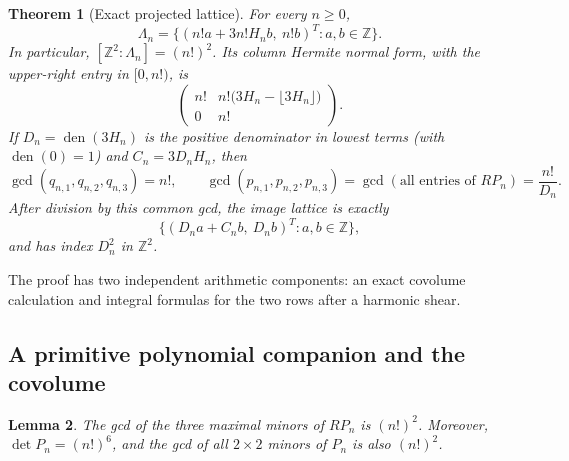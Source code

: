 \documentclass[11pt,a4paper]{article}
\newtheorem{theorem}{Theorem}[section]
\newtheorem{lemma}[theorem]{Lemma}
\theoremstyle{definition}
\theoremstyle{remark}
\newcommand{\Z}{\mathbb Z}
\DeclareMathOperator{\den}{den}
\numberwithin{equation}{section}
\begin{document}
\begin{theorem}[Exact projected lattice]\label{p7:thm:lat-main}
For every $n\geq0$,
\begin{equation}\label{p7:eq:lat-exact}
\Lambda_n
=\bigl\{(n!a+3n!H_nb,\ n!b)^T:a,b\in\Z\bigr\}.
\end{equation}
In particular, $[\Z^2:\Lambda_n]=(n!)^2$.  Its column Hermite normal
form, with the upper-right entry in $[0,n!)$, is
\begin{equation}\label{p7:eq:lat-HNF}
\begin{pmatrix}
n!&n!\bigl(3H_n-\lfloor3H_n\rfloor\bigr)\\
0&n!
\end{pmatrix}.
\end{equation}
If $D_n=\den(3H_n)$ is the positive denominator in lowest terms
(with $\den(0)=1$) and $C_n=3D_nH_n$, then
\begin{equation}\label{p7:eq:lat-content}
\gcd(q_{n,1},q_{n,2},q_{n,3})=n!,\qquad
\gcd(p_{n,1},p_{n,2},p_{n,3})=
\gcd(\text{all entries of }RP_n)=\frac{n!}{D_n}.
\end{equation}
After division by this common gcd, the image lattice is exactly
\begin{equation}\label{p7:eq:lat-normalized}
\bigl\{(D_na+C_nb,\ D_nb)^T:a,b\in\Z\bigr\},
\end{equation}
and has index $D_n^2$ in $\Z^2$.
\end{theorem}

The proof has two independent arithmetic components: an exact covolume
calculation and integral formulas for the two rows after a harmonic shear.

\subsection{A primitive polynomial companion and the covolume}

\begin{lemma}\label{p7:lem:lat-covolume}
The gcd of the three maximal minors of $RP_n$ is $(n!)^2$.
Moreover, $\det P_n=(n!)^6$, and the gcd of all $2\times2$ minors of
$P_n$ is also $(n!)^2$.
\end{lemma}
\end{document}
